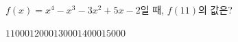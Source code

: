 $f(x)=x^4-x^3-3x^2+5x-2$일 때, $f(11)$의 값은?
\begin{choices32}{$11000$}{$12000$}{$13000$}{$14000$}{$15000$}\end{choices32}
